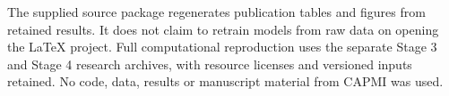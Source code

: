 \documentclass[11pt,a4paper]{article}
\begin{document}
The supplied source package regenerates publication tables and figures from retained results. It does not claim to retrain models from raw data on opening the LaTeX project. Full computational reproduction uses the separate Stage 3 and Stage 4 research archives, with resource licenses and versioned inputs retained. No code, data, results or manuscript material from CAPMI was used.



\end{document}
